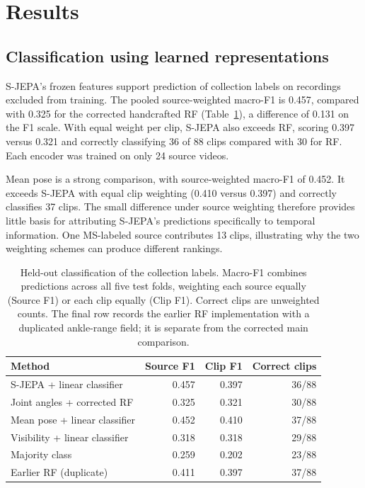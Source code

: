 \section{Results}
\subsection{Classification using learned representations}
S-JEPA's frozen features support prediction of collection labels on recordings excluded from training. The pooled source-weighted macro-F1 is 0.457, compared with 0.325 for the corrected handcrafted RF (Table~\ref{tab:heldout_revised}), a difference of 0.131 on the F1 scale. With equal weight per clip, S-JEPA also exceeds RF, scoring 0.397 versus 0.321 and correctly classifying 36 of 88 clips compared with 30 for RF. Each encoder was trained on only 24 source videos.

Mean pose is a strong comparison, with source-weighted macro-F1 of 0.452. It exceeds S-JEPA with equal clip weighting (0.410 versus 0.397) and correctly classifies 37 clips. The small difference under source weighting therefore provides little basis for attributing S-JEPA's predictions specifically to temporal information. One MS-labeled source contributes 13 clips, illustrating why the two weighting schemes can produce different rankings.

\begin{table}[t]
\centering
\small
\setlength{\tabcolsep}{3pt}
\begin{tabular}{@{}p{}rrr@{}}
\hline
Method & Source F1 & Clip F1 & Correct clips \\
\hline
S-JEPA + linear classifier & 0.457 & 0.397 & 36/88 \\
Joint angles + corrected RF & 0.325 & 0.321 & 30/88 \\
Mean pose + linear classifier & 0.452 & 0.410 & 37/88 \\
Visibility + linear classifier & 0.318 & 0.318 & 29/88 \\
Majority class & 0.259 & 0.202 & 23/88 \\
\hline
Earlier RF (duplicate) & 0.411 & 0.397 & 37/88 \\
\hline
\end{tabular}
\caption{Held-out classification of the collection labels. Macro-F1 combines predictions across all five test folds, weighting each source equally (Source F1) or each clip equally (Clip F1). Correct clips are unweighted counts. The final row records the earlier RF implementation with a duplicated ankle-range field; it is separate from the corrected main comparison.}
\label{tab:heldout_revised}
\end{table}

